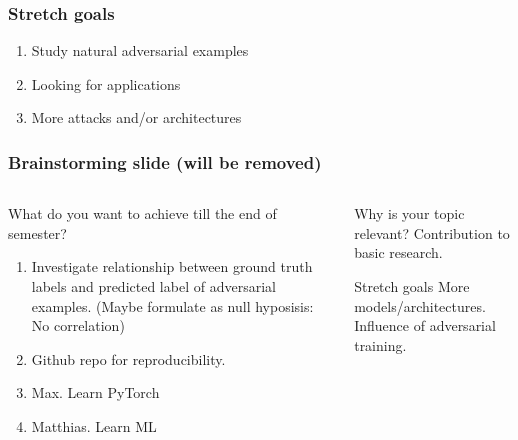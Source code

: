 \documentclass[10pt,usepdftitle=false,aspectratio=169]{beamer}
\begin{document}
\begin{frame}[fragile]
	\frametitle{Stretch goals}
	\begin{enumerate}
		\item Study natural adversarial examples
		\item Looking for applications
		\item More attacks and/or architectures
	\end{enumerate}
\end{frame}

\begin{frame}[fragile]
	\frametitle{Brainstorming slide (will be removed)}
	\begin{columns}
		\begin{column}{.5\columnwidth}
			\begin{alertblock}{What do you want to achieve till the end of semester?}
				\begin{enumerate}
					\item Investigate relationship between ground truth labels and predicted label of adversarial examples. (Maybe formulate as null hyposisis: No correlation)
					\item Github repo for reproducibility.
					\item Max. Learn PyTorch
					\item Matthias. Learn ML  
				\end{enumerate}
			\end{alertblock}
		\end{column}
		\begin{column}{.5\columnwidth}
			\begin{block}{Why is your topic relevant?}
				Contribution to basic research. 
			\end{block}
			\begin{alertblock}{Stretch goals}
			More models/architectures.
			Influence of adversarial training.
			\end{alertblock}
		\end{column}
	\end{columns}
\end{frame}
\end{document}
